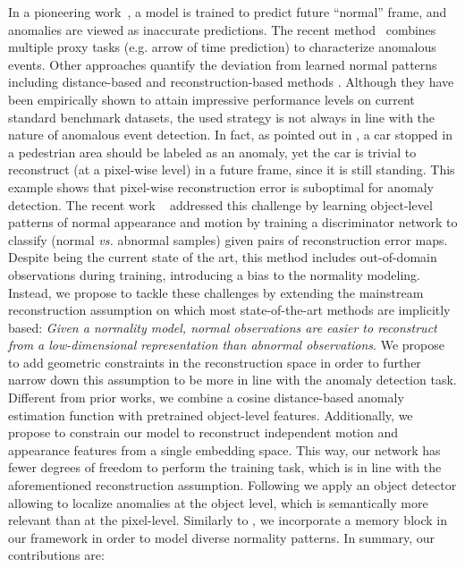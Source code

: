 \documentclass{article}
\begin{document}
In a pioneering work~\cite{liu2018ano_pred}, a model is trained to predict future ``normal'' frame, and anomalies are viewed as inaccurate predictions. 
The recent method~\cite{ssmt} combines
multiple proxy tasks (e.g. arrow of time prediction)  to characterize anomalous events. Other approaches quantify the deviation from learned normal patterns including distance-based \cite{dummyae, ionescu_narrowclusters,streetscene,siamese,any-shot} and reconstruction-based methods \cite{app-mo,memae,mnad,ssmt,baf}. 
Although they have been empirically shown to attain impressive performance levels on current standard benchmark datasets, the used strategy is not always in line with the nature of anomalous event detection. In fact, as pointed out in \cite{ssmt} , a car stopped in a pedestrian area should be labeled as an anomaly, yet the car is trivial to reconstruct (at a pixel-wise level) in a future frame, since it is still standing. 
This example shows that pixel-wise reconstruction error is suboptimal for anomaly detection. The recent work ~\cite{baf} addressed this challenge by learning object-level patterns of normal appearance and motion by training a discriminator network to classify (normal {\it vs.} abnormal samples) given pairs of reconstruction error maps. Despite being the current state of the art, this method includes out-of-domain observations during training, introducing a bias to the normality modeling. Instead, we propose to tackle these challenges by extending the mainstream reconstruction assumption on which most state-of-the-art methods \cite{liu2018ano_pred,memae,mnad,baf} are implicitly based: \textit{Given a normality model, normal observations are easier to reconstruct from a low-dimensional representation than abnormal observations}. We propose to add geometric constraints in the reconstruction space in order to further narrow down this assumption to be more in line with the anomaly detection task. Different from prior works, we combine a cosine distance-based anomaly estimation function with pretrained object-level features. Additionally, we propose to constrain our model to reconstruct independent motion and appearance features from a single embedding space. This way, our network has fewer degrees of freedom to perform the training task, which is in line with the aforementioned reconstruction assumption. Following \cite{dummyae,any-shot,cl_doshi20,ssmt,baf} we apply an object detector allowing to localize anomalies at the object level, which is semantically more relevant than at the pixel-level. Similarly to \cite{memae,mnad}, we incorporate a memory block in our framework in order to model diverse normality patterns. In summary, our contributions are:  
\end{document}

